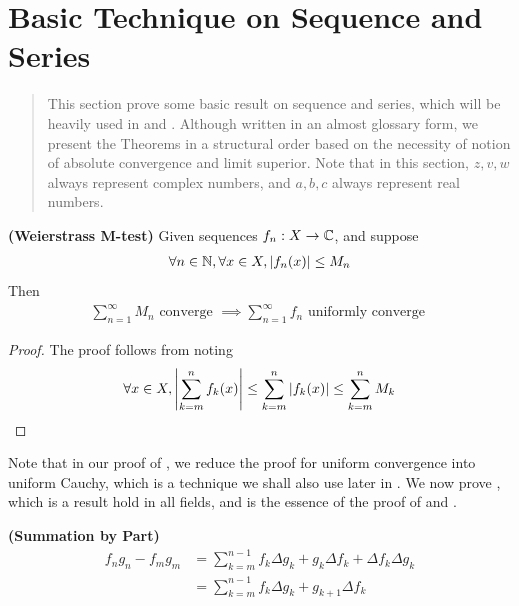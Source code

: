 \documentclass{report}
\begin{document}
\section{Basic Technique on Sequence and Series}
\label{Basic Technique on Sequence and Series}
\begin{abstract}
This section prove some basic result on sequence and series, which will be heavily used in  and . Although written in an almost glossary form, we present the Theorems in a structural order based on the necessity of notion of absolute convergence and limit superior. Note that in this section, $z,v,w$ always represent complex numbers, and $a,b,c$ always represent real numbers.  
\end{abstract}
\begin{theorem}
\label{WM-t}
\textbf{(Weierstrass M-test)} Given sequences $f_n:X\rightarrow \mathbb{C}$, and suppose 
\begin{align*}
\forall n\in\mathbb{N},\forall x\in X, \left|f_n(x)\right|\leq M_n
\end{align*}
Then 
\begin{align*}
\sum_{n=1}^\infty M_n\text{ converge }\implies \sum_{n=1}^\infty f_n\text{ uniformly converge }
\end{align*} 
\end{theorem}
\begin{proof}
The proof follows from noting 
\begin{align*}
  \forall x\in X, \left|\sum_{k=m}^n f_k(x)\right|\leq \sum_{k=m}^n \left|f_k(x)\right|\leq \sum_{k=m}^n M_k
\end{align*}
\end{proof}
\begin{mdframed}
  Note that in our proof of  , we reduce the proof for uniform convergence into uniform Cauchy, which is a technique we shall also use later in . We now prove , which is a result hold in all fields, and is the essence of the proof of  and . 
\end{mdframed}
\begin{theorem}
\label{Summation by Part}
\textbf{(Summation by Part)} 
\begin{align*}
  f_ng_n-f_mg_m&=\sum_{k=m}^{n-1}f_k \Delta g_k + g_k \Delta f_k+ \Delta f_k \Delta g_k \\
  &=\sum_{k=m}^{n-1}f_k \Delta g_k + g_{k+1}\Delta f_k
\end{align*}
\end{theorem}
\end{document}

